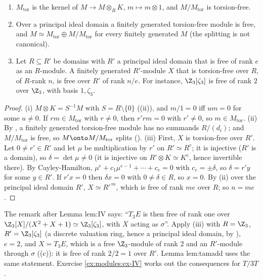 \begin{proposition}\label{prop:modules:torsion}
\begin{enumerate}[label=(\roman*)]
\item $M_{\mathrm{tor}}$ is the kernel of $M\to M\otimes_RK$, $m\mapsto m\otimes1$, and $M/M_{\mathrm{tor}}$ is torsion-free.
\item Over a principal ideal domain a finitely generated torsion-free module is free, and $M\simeq M_{\mathrm{tor}}\oplus M/M_{\mathrm{tor}}$ for every
finitely generated $M$ (the splitting is not canonical).
\item Let $R\subseteq R'$ be domains with $R'$ a principal ideal domain that is free of rank $e$ as an $R$-module. A finitely generated
$R'$-module $X$ that is torsion-free over $R$, of $R$-rank $n$, is free over $R'$ of rank $n/e$. For instance, $\Z_3[\zeta_3]$ is free of
rank $2$ over $\Z_3$, with basis $1,\zeta_3$.
\end{enumerate}
\end{proposition}

\begin{proof}
(i) $M\otimes K=S^{-1}M$ with $S=R\setminus\{0\}$ ((ii)), and $m/1=0$ iff $um=0$ for some $u\ne0$. If $rm\in M_{\mathrm{tor}}$
with $r\ne0$, then $r'rm=0$ with $r'\ne0$, so $m\in M_{\mathrm{tor}}$.
(ii) By , a finitely generated torsion-free module has no summands $R/(d_i)$; and $M/M_{\mathrm{tor}}$ is free, so
$M\onto M/M_{\mathrm{tor}}$ splits ().
(iii) First, $X$ is torsion-free over $R'$. Let $0\ne r'\in R'$ and let $\mu$ be multiplication by $r'$ on $R'\simeq R^e$; it is
injective ($R'$ is a domain), so $\delta=\det\mu\ne0$ (it is injective on $R'\otimes K\simeq K^e$, hence invertible there). By
Cayley-Hamilton, $\mu^e+c_1\mu^{e-1}+\cdots+c_e=0$ with $c_e=\pm\delta$, so $\delta=r'y$ for some $y\in R'$. If $r'x=0$ then $\delta x=0$ with
$0\ne\delta\in R$, so $x=0$. By (ii) over the principal ideal domain $R'$, $X\simeq R'^{\,m}$, which is free of rank $me$ over $R$; so $n=me$.
\end{proof}

\begin{paperlink}\label{pl:modules:IV}
The remark after Lemma lem:IV says: ``$T_3E$ is then free of rank one over $\Z_3[X]/(X^2+X+1)\simeq\Z_3[\zeta_3]$, with $X$ acting as
$\sigma$''. Apply (iii) with $R=\Z_3$, $R'=\Z_3[\zeta_3]$ (a discrete valuation ring, hence a principal ideal
domain, by ), $e=2$, and $X=T_3E$, which is a free $\Z_3$-module of rank $2$ and an $R'$-module through $\sigma$
((c)): it is free of rank $2/2=1$ over $R'$. Lemma lem:tamadd uses the same statement. Exercise
\ref{ex:modules:ex-IV} works out the consequences for $T/3T$.
\end{paperlink}

